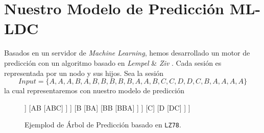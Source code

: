 


\section{Nuestro Modelo de Predicción ML-LDC}






Basados en un servidor de \emph{Machine Learning}, hemos desarrollado un motor de predicción con un algoritmo basado en \emph{Lempel} \& \emph{Ziv} \cite{ZivLempel1977}. Cada sesión es representada por un nodo y sus hijos. Sea la sesión \begin{equation}
Input = \{ A,A,A,B,A,B,B,B,B,B,A,A,B,C,C,D,D,C,B,A,A,A,A \}
\end{equation} la cual representaremos con nuestro modelo de predicción



\begin{figure}[h] 
	\centering
	\begin{forest} 
	[ $\epsilon$
		[A
			[AA
				[AAA]	
			]
			[AB
				[ABC]
			]
		]
		[B
			[BA]
			[BB
				[BBA]
			]
		]
		[C]
		[D
			[DC]
		]
	]
	\end{forest}
	\caption{Ejemplod de Árbol de Predicción basado en \texttt{LZ78}.}
	\label{fig:lztrie1}
\end{figure}


